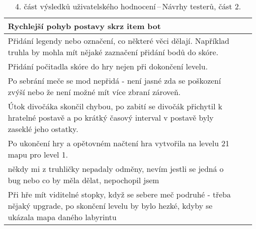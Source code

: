 \begin{table}[htbp]
\begin{tabularx}{\textwidth}{|X|X|X|}
Rychlejší pohyb postavy skrz item bot \\ \hline

Přidání legendy nebo označení, co některé věci dělají. Například truhla by mohla mít nějaké zaznačení přidání bodů do skóre.\\ 
Přidání počitadla skóre do hry nejen při dokončení levelu.\\ 
Po sebrání meče se mod nepřidá - není jasné zda se poškození zvýší nebo že není možné mít více zbraní zároveň. \\ 
Útok divočáka skončil chybou, po zabití se divočák přichytil k hratelné postavě a po krátký časový interval v postavě byly zaseklé jeho ostatky.\\ 
Po ukončení hry a opětovném načtení hra vytvořila na levelu 21 mapu pro level 1.\\ \hline

někdy mi z truhličky nepadaly odměny, nevím jestli se jedná o bug nebo co by měla dělat, nepochopil jsem\\ \hline

Při hře mít  viditelné stopky, když se sebere meč podruhé - třeba nějaký upgrade, po skončení levelu by bylo hezké, kdyby se ukázala mapa daného labyrintu \\ \hline

\end{tabularx}
\caption{4. část výsledků uživatelského hodnocení\,--\,Návrhy testerů, část 2.}
\end{table}


%
